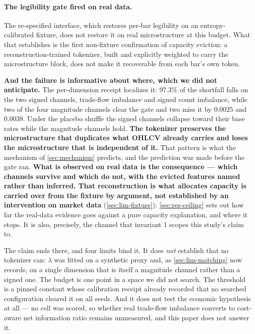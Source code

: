 \paragraph{The legibility gate fired on real data.} The re-specified interface, which restores
per-bar legibility on an entropy-calibrated fixture, does not restore it on real microstructure at
this budget. What that establishes is the first non-fixture confirmation of capacity eviction: a
reconstruction-trained tokenizer, built and explicitly weighted to carry the microstructure block,
does not make it recoverable from each bar's own token.

\textbf{And the failure is informative about where, which we did not anticipate.} The per-dimension
receipt localizes it: $97.3\%$ of the shortfall falls on the two signed channels, trade-flow
imbalance and signed count imbalance, while two of the four magnitude channels clear the gate and
two miss it by $0.0025$ and $0.0038$. Under the placebo shuffle the signed channels collapse toward
their base rates while the magnitude channels hold.
\textbf{The tokenizer preserves the microstructure that duplicates what OHLCV already carries and
loses the microstructure that is independent of it.} That pattern is what the mechanism of
\cref{sec:mechanism} predicts, and the prediction was made before the gate ran. \textbf{What is
observed on real data is the consequence --- which channels survive and which do not, with the
evicted features named rather than inferred. That reconstruction is what allocates capacity is
carried over from the fixture by argument, not established by an intervention on market data}
(\cref{sec:lim-fixture}); \cref{sec:res-ceiling} sets out how far the real-data evidence goes
against a pure capacity explanation, and where it stops. It is also, precisely, the channel that
invariant 1 scopes this study's claim to.

The claim ends there, and four limits bind it. It does \emph{not} establish that no tokenizer can:
$\lambda$ was fitted on a synthetic proxy and, as \cref{sec:lim-matching} now records, on a single
dimension that is itself a magnitude channel rather than a signed one. The budget is one point in a
space we did not search. The threshold is a pinned constant whose calibration receipt already
recorded that no searched configuration cleared it on all seeds. And it does not test the economic
hypothesis at all --- no cell was scored, so whether real trade-flow imbalance converts to
cost-aware net information ratio remains unmeasured, and this paper does not answer it.

